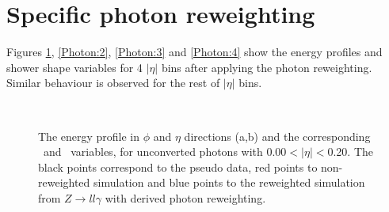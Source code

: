 \section{Specific photon reweighting}
\label{Adx1:Photon}

Figures \ref{Photon:1}, \ref{Photon:2}, \ref{Photon:3} and \ref{Photon:4} show the energy profiles and shower shape variables for 4 $|\eta|$ bins after applying the photon reweighting. Similar behaviour is observed for the rest of $|\eta|$ bins.  
\begin{figure}[ht]
    \centering
	 \\
    \caption{The energy profile in $\phi$ and $\eta$ directions (a,b) and the corresponding \Rphi \ and \Reta \ variables, for unconverted photons with 0.00$<|\eta|<$0.20. The black points correspond to the pseudo data, red points to non-reweighted simulation and blue points to the reweighted simulation from $Z\rightarrow ll\gamma$ with derived photon reweighting.}
    \label{Photon:1}
\end{figure}
